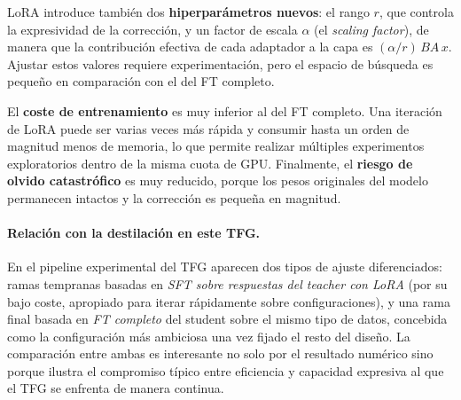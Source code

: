 \documentclass[11pt,a4paper]{article}
\begin{document}
LoRA introduce también dos \textbf{hiperparámetros nuevos}: el rango $r$, que controla la expresividad de la corrección, y un factor de escala $\alpha$ (el \textit{scaling factor}), de manera que la contribución efectiva de cada adaptador a la capa es $(\alpha/r)\, B A\, x$. Ajustar estos valores requiere experimentación, pero el espacio de búsqueda es pequeño en comparación con el del FT completo.

El \textbf{coste de entrenamiento} es muy inferior al del FT completo. Una iteración de LoRA puede ser varias veces más rápida y consumir hasta un orden de magnitud menos de memoria, lo que permite realizar múltiples experimentos exploratorios dentro de la misma cuota de GPU. Finalmente, el \textbf{riesgo de olvido catastrófico} es muy reducido, porque los pesos originales del modelo permanecen intactos y la corrección es pequeña en magnitud.

\paragraph{Relación con la destilación en este TFG.} En el pipeline experimental del TFG aparecen dos tipos de ajuste diferenciados: ramas tempranas basadas en \emph{SFT sobre respuestas del teacher con LoRA} (por su bajo coste, apropiado para iterar rápidamente sobre configuraciones), y una rama final basada en \emph{FT completo} del student sobre el mismo tipo de datos, concebida como la configuración más ambiciosa una vez fijado el resto del diseño. La comparación entre ambas es interesante no solo por el resultado numérico sino porque ilustra el compromiso típico entre eficiencia y capacidad expresiva al que el TFG se enfrenta de manera continua.
\end{document}
